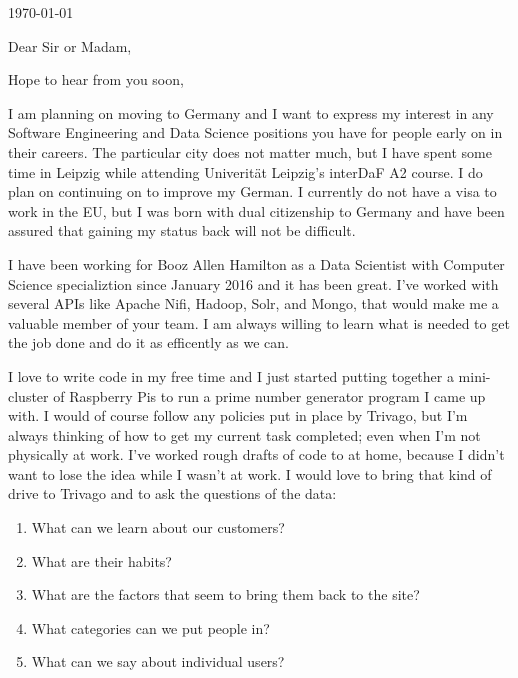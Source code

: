 \documentclass[11pt,a4paper,sans]{moderncv}        %
\begin{document}
\today
\opening{Dear Sir or Madam,}
\closing{Hope to hear from you soon,}
\makelettertitle

I am planning on moving to Germany and I want to express my interest in any Software Engineering and Data Science positions you have for people early on in their careers. The particular city does not matter much, but I have spent some time in Leipzig while attending Univerität Leipzig's interDaF A2 course. I do plan on continuing on to improve my German. I currently do not have a visa to work in the EU, but I was born with dual citizenship to Germany and have been assured that gaining my status back will not be difficult.

I have been working for Booz Allen Hamilton as a Data Scientist with Computer Science specializtion since January 2016 and it has been great. I've worked with several APIs like Apache Nifi, Hadoop, Solr, and Mongo, that would make me a valuable member of your team. I am always willing to learn what is needed to get the job done and do it as efficently as we can.

I love to write code in my free time and I just started putting together a mini-cluster of Raspberry Pis to run a prime number generator program I came up with. I would of course follow any policies put in place by Trivago, but I'm always thinking of how to get my current task completed; even when I'm not physically at work. I've worked rough drafts of code to at home, because I didn't want to lose the idea while I wasn't at work. I would love to bring that kind of drive to Trivago and to ask the questions of the data:
\begin{enumerate}[leftmargin=3em]
\item What can we learn about our customers?
\item What are their habits?
\item What are the factors that seem to bring them back to the site?
\item What categories can we put people in?
\item What can we say about individual users?
\end{enumerate}
\makeletterclosing
\end{document}
